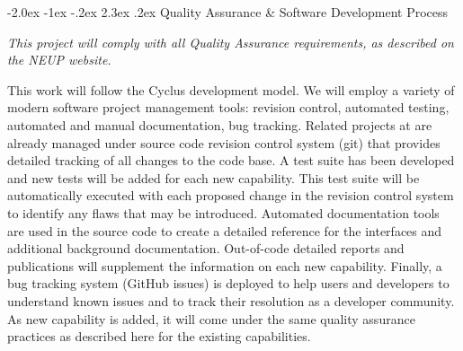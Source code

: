 \documentclass[dvips,12pt]{article}
\makeatletter
\renewcommand\section{\@startsection {section}{1}{\z@}%
                                   {-2.0ex \@plus -1ex \@minus -.2ex}%
                                   {2.3ex \@plus.2ex}%
                                   {\normalfont\bfseries}}%
\makeatother
\begin{document}
\section{Quality Assurance \& Software Development Process}

\textit{This project will comply with all Quality
  Assurance requirements, as described on the NEUP
  website.}  

This work will follow the Cyclus development
model.  We will employ a variety of modern
software project management tools: revision
control, automated testing, automated and manual
documentation, bug tracking. Related projects at
are already managed under source code revision
control system (git) that provides detailed
tracking of all changes to the code base. A test
suite has been developed and new tests will be
added for each new capability. This test suite
will be automatically executed with each proposed
change in the revision control system to identify
any flaws that may be introduced. Automated
documentation tools are used in the source code to
create a detailed reference for the interfaces and
additional background documentation. Out-of-code
detailed reports and publications will supplement
the information on each new capability. Finally, a
bug tracking system (GitHub issues) is deployed to
help users and developers to understand known
issues and to track their resolution as a
developer community. As new capability is added,
it will come under the same quality assurance
practices as described here for the existing
capabilities.







\label{LastPage}
\end{document}
